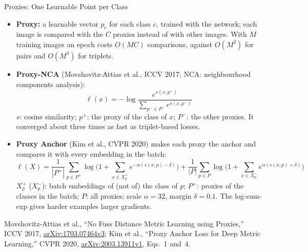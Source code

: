 \begin{frame}{Proxies: One Learnable Point per Class}
  \begin{itemize}\footnotesize\itemsep0.3em
    \item \textbf{Proxy:} a learnable vector $p_c$ for each class $c$, trained with the network; each image is compared with the $C$ proxies instead of with other images. With $M$ training images an epoch costs $O(MC)$ comparisons, against $O(M^2)$ for pairs and $O(M^3)$ for triplets.
    \item \textbf{Proxy-NCA} (Movshovitz-Attias et al., ICCV 2017; NCA: neighbourhood components analysis):
    \[ \ell(x)=-\log\frac{e^{s(x,p^+)}}{\sum_{p^-\in P^-}e^{s(x,p^-)}} \]
    $s$: cosine similarity; $p^+$: the proxy of the class of $x$; $P^-$: the other proxies. It converged about three times as fast as triplet-based losses.
    \item \textbf{Proxy Anchor} (Kim et al., CVPR 2020) makes each proxy the anchor and compares it with every embedding in the batch:
    \[ \ell(X)=\frac{1}{|P^+|}\sum_{p\in P^+}\log\Big(1+\!\sum_{x\in X_p^+}\!e^{-\alpha(s(x,p)-\delta)}\Big)+\frac{1}{|P|}\sum_{p\in P}\log\Big(1+\!\sum_{x\in X_p^-}\!e^{\alpha(s(x,p)+\delta)}\Big) \]
    $X_p^+$ ($X_p^-$): batch embeddings of (not of) the class of $p$; $P^+$: proxies of the classes in the batch; $P$: all proxies; scale $\alpha=32$, margin $\delta=0.1$. The log-sum-exp gives harder examples larger gradients.
  \end{itemize}
  \vspace{0.2em}
  {\scriptsize Movshovitz-Attias et al., ``No Fuss Distance Metric Learning using Proxies,'' ICCV 2017, \href{https://arxiv.org/abs/1703.07464v3}{arXiv:1703.07464v3}; Kim et al., ``Proxy Anchor Loss for Deep Metric Learning,'' CVPR 2020, \href{https://arxiv.org/abs/2003.13911v1}{arXiv:2003.13911v1}, Eqs.~1 and~4.\par}
\end{frame}

